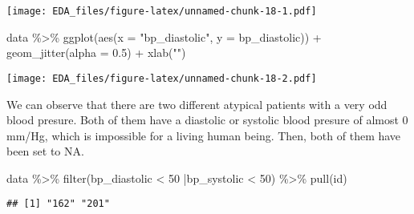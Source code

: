 \documentclass[
]{article}
\newenvironment{Shaded}{\begin{snugshade}}{\end{snugshade}}
\newcommand{\AttributeTok}[1]{\textcolor[rgb]{0.77,0.63,0.00}{#1}}
\newcommand{\CommentTok}[1]{\textcolor[rgb]{0.56,0.35,0.01}{\textit{#1}}}
\newcommand{\ConstantTok}[1]{\textcolor[rgb]{0.00,0.00,0.00}{#1}}
\newcommand{\DecValTok}[1]{\textcolor[rgb]{0.00,0.00,0.81}{#1}}
\newcommand{\FloatTok}[1]{\textcolor[rgb]{0.00,0.00,0.81}{#1}}
\newcommand{\FunctionTok}[1]{\textcolor[rgb]{0.00,0.00,0.00}{#1}}
\newcommand{\NormalTok}[1]{#1}
\newcommand{\OtherTok}[1]{\textcolor[rgb]{0.56,0.35,0.01}{#1}}
\newcommand{\SpecialCharTok}[1]{\textcolor[rgb]{0.00,0.00,0.00}{#1}}
\newcommand{\StringTok}[1]{\textcolor[rgb]{0.31,0.60,0.02}{#1}}
\begin{document}
\texttt{[image: EDA\_files/figure-latex/unnamed-chunk-18-1.pdf]}

\begin{Shaded}
\begin{Highlighting}[]
\NormalTok{data }\SpecialCharTok{\%\textgreater{}\%} 
  \FunctionTok{ggplot}\NormalTok{(}\FunctionTok{aes}\NormalTok{(}\AttributeTok{x =} \StringTok{"bp\_diastolic"}\NormalTok{, }\AttributeTok{y =}\NormalTok{ bp\_diastolic)) }\SpecialCharTok{+}
  \FunctionTok{geom\_jitter}\NormalTok{(}\AttributeTok{alpha =} \FloatTok{0.5}\NormalTok{) }\SpecialCharTok{+}
  \FunctionTok{xlab}\NormalTok{(}\StringTok{""}\NormalTok{)}
\end{Highlighting}
\end{Shaded}

\texttt{[image: EDA\_files/figure-latex/unnamed-chunk-18-2.pdf]}

We can observe that there are two different atypical patients with a
very odd blood presure. Both of them have a diastolic or systolic blood
presure of almost 0 mm/Hg, which is impossible for a living human being.
Then, both of them have been set to NA.

\begin{Shaded}
\begin{Highlighting}[]
\NormalTok{data }\SpecialCharTok{\%\textgreater{}\%} 
  \FunctionTok{filter}\NormalTok{(bp\_diastolic }\SpecialCharTok{\textless{}} \DecValTok{50} \SpecialCharTok{|}\NormalTok{bp\_systolic }\SpecialCharTok{\textless{}} \DecValTok{50}\NormalTok{) }\SpecialCharTok{\%\textgreater{}\%} 
  \FunctionTok{pull}\NormalTok{(id)}
\end{Highlighting}
\end{Shaded}

\begin{verbatim}
## [1] "162" "201"
\end{verbatim}

\begin{Shaded}
\end{Shaded}
\end{document}
